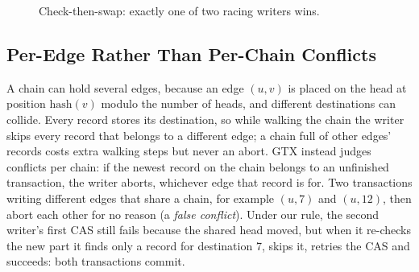 \documentclass[11pt,a4paper,oneside]{report}
\begin{document}
\begin{figure}[H]
\centering
{}
\caption{Check-then-swap: exactly one of two racing writers wins.}
\label{fig:cas}
\end{figure}

\subsection{Per-Edge Rather Than Per-Chain Conflicts}
A chain can hold several edges, because an edge $(u,v)$ is placed on the head at position $\mathrm{hash}(v)$ modulo the
number of heads, and different destinations can collide. Every record stores its destination, so while walking the
chain the writer skips every record that belongs to a different edge; a chain full of other edges' records costs extra
walking steps but never an abort. GTX instead judges conflicts per chain: if the newest record on the chain belongs to
an unfinished transaction, the writer aborts, whichever edge that record is for. Two transactions writing different
edges that share a chain, for example $(u,7)$ and $(u,12)$, then abort each other for no reason (a \emph{false
conflict}). Under our rule, the second writer's first CAS still fails because the shared head moved, but when it
re-checks the new part it finds only a record for destination 7, skips it, retries the CAS and succeeds: both
transactions commit.
\end{document}
